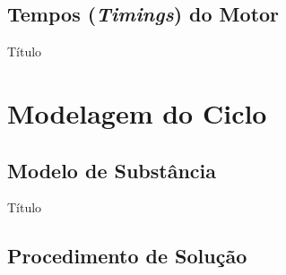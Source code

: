 \subsection{Tempos (\emph{Timings}) do Motor}

    \begin{frame}{Título}\vspace*{-2em}
    \end{frame}

\section{Modelagem do Ciclo}

\subsection{Modelo de Substância}

    \begin{frame}{Título}\vspace*{-2em}
    \end{frame}

\subsection{Procedimento de Solução}

